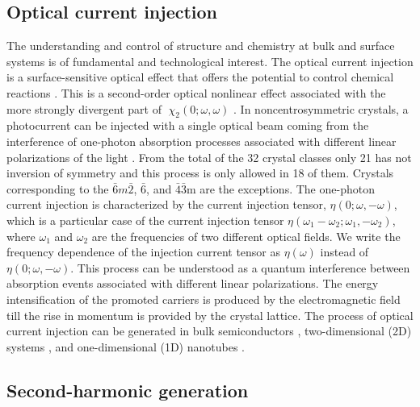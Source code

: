 \documentclass[pss]{wiley2sp} %
\begin{document}
\subsection{Optical current injection}

The understanding and control of structure and chemistry at bulk and surface systems is of fundamental and technological interest. The optical current injection is a surface-sensitive optical effect that offers the potential to control chemical reactions \cite{bhatPRB05,hachePRL97}. This is a second-order optical nonlinear effect associated with the more strongly divergent part of 􏰡$\chi_{2}(0;\omega,\omega)$ \cite{sipePRB00}. In noncentrosymmetric crystals, a photocurrent can be injected with a single optical beam coming  from the interference of one-photon absorption processes associated with different linear polarizations of the light \cite{sipePRB00}. From the total of the 32 crystal classes only 21 has not inversion of symmetry and this process is only allowed in 18 of them. Crystals corresponding to the $\bar{6}m\bar{2}$, $\bar{6}$, and $\bar{4}$$\bar{3}$m are the exceptions. The one-photon current injection is characterized by the current injection tensor, $\eta(0; \omega, − \omega)$, which is a particular case of the current injection tensor $\eta(\omega_{1}-\omega_{2}; \omega_{1},-\omega_{2})$, where $\omega_{1}$ and $\omega_{2}$ are the frequencies of two different optical fields. We write the frequency dependence of the injection current tensor as $\eta(\omega)$ instead of $\eta(0; \omega, − \omega)$. This process can be understood as a quantum interference between absorption events associated with different linear polarizations. The energy intensification of the promoted carriers is produced by the electromagnetic field till the rise in momentum is provided by the crystal lattice. The process of optical current injection can be generated in bulk semiconductors \cite{hachePRL97,sipePRB00}, two-dimensional (2D) systems \cite{melePRB00,cabellosPRB11}, and one-dimensional (1D) nanotubes \cite{melePRB00}. 

\subsection{Second-harmonic generation}
\end{document}
